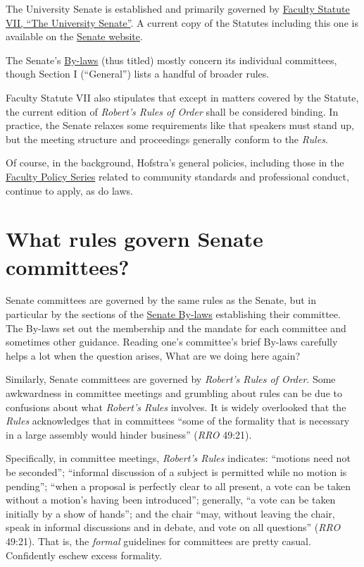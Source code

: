 \documentclass[12pt]{article}
\begin{document}
The University Senate is established and primarily governed by
\href{https://www.hofstra.edu/sites/default/files/2024-04/facultystatutes.pdf}{Faculty
Statute VII, ``The University Senate''}. A current copy of the Statutes
including this one is available on the
\href{https://www.hofstra.edu/senate/}{Senate website}.

The Senate's
\href{https://www.hofstra.edu/sites/default/files/2022-04/senatebylaws.pdf}{By-laws}
(thus titled) mostly concern its individual committees, though Section I
(``General'') lists a handful of broader rules.

Faculty Statute VII also stipulates that except in matters covered by
the Statute, the current edition of \emph{Robert's Rules of Order} shall
be considered binding. In practice, the Senate relaxes some requirements
like that speakers must stand up, but the meeting structure and
proceedings generally conform to the \emph{Rules}.

Of course, in the background, Hofstra's general policies, including
those in the
\href{https://www.hofstra.edu/senate/faculty-policy-series.html}{Faculty
Policy Series} related to community standards and professional conduct,
continue to apply, as do laws.

\section{What rules govern Senate
committees?}\label{what-rules-govern-senate-committees}

Senate committees are governed by the same rules as the Senate, but in
particular by the sections of the
\href{https://www.hofstra.edu/sites/default/files/2022-04/senatebylaws.pdf}{Senate
By-laws} establishing their committee. The By-laws set out the
membership and the mandate for each committee and sometimes other
guidance. Reading one's committee's brief By-laws carefully helps a lot
when the question arises, What are we doing here again?

Similarly, Senate committees are governed by \emph{Robert's Rules of
Order}. Some awkwardness in committee meetings and grumbling about rules
can be due to confusions about what \emph{Robert's Rules} involves. It
is widely overlooked that the \emph{Rules} acknowledges that in
committees ``some of the formality that is necessary in a large assembly
would hinder business'' (\emph{RRO} 49:21).

Specifically, in committee meetings, \emph{Robert's Rules} indicates:
``motions need not be seconded''; ``informal discussion of a subject is
permitted while no motion is pending''; ``when a proposal is perfectly
clear to all present, a vote can be taken without a motion's having been
introduced''; generally, ``a vote can be taken initially by a show of
hands''; and the chair ``may, without leaving the chair, speak in
informal discussions and in debate, and vote on all questions''
(\emph{RRO} 49:21). That is, the \emph{formal} guidelines for committees
are pretty casual. Confidently eschew excess formality.
\end{document}
